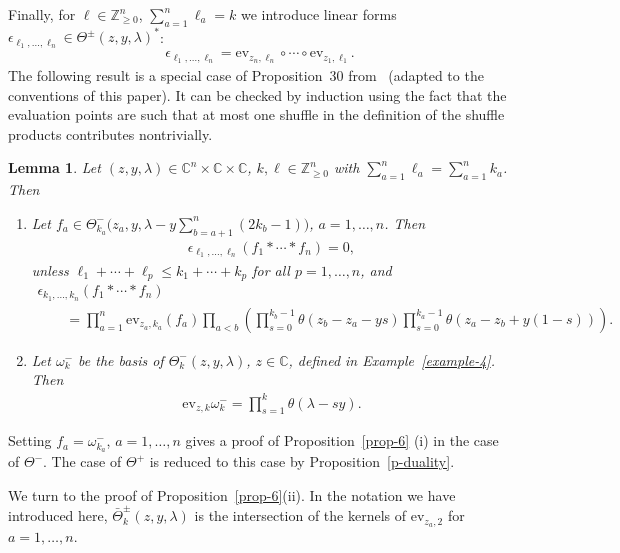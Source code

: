 \documentclass[pdftex]{sigma}
\numberwithin{equation}{section}
\newtheorem{Lemma}[Theorem]{Lemma}
\begin{document}
Finally, for $\ell\in\mathbb Z_{\geq0}^n$, $\sum\limits_{a=1}^n\ell_a=k$ we introduce linear forms $\epsilon_{\ell_1,\dots,\ell_n}\in\Theta^\pm(z,y,\lambda)^*$:
\begin{gather*}
 \epsilon_{\ell_1,\dots,\ell_n}= \mathrm{ev}_{z_n,\ell_n}\circ\cdots\circ\mathrm{ev}_{z_1,\ell_1}.
\end{gather*}
The following result is a special case of Proposition~30 from~\cite{FelderTarasovVarchenko1997} (adapted to the conventions of this paper). It can be checked by induction using the fact that the evaluation points are such that at most one shuffle in the definition of the shuffle products contributes nontrivially.
\begin{Lemma}\label{lemma-7} Let $(z,y,\lambda)\in\mathbb C^n\times \mathbb C\times\mathbb C$, $k,\ell\in\mathbb Z_{\geq0}^n$ with $\sum\limits_{a=1}^n\ell_a= \sum\limits_{a=1}^n k_a$. Then
 \begin{enumerate}\itemsep=0pt
 \item[$(i)$] Let $f_a\in\Theta^-_{k_a}\Big(z_a,y,\lambda-y\sum\limits_{b=a+1}^n(2k_b-1)\Big)$, $a=1,\dots,n$. Then
 \begin{gather*}
 \epsilon_{\ell_1,\dots,\ell_n}(f_1*\cdots*f_n)=0,
 \end{gather*}
 unless $\ell_1+\cdots+\ell_p\leq k_1+\cdots+k_p$ for all $p=1,\dots,n$, and
 \begin{gather*}
 \epsilon_{k_1,\dots,k_n} (f_1*\cdots*f_n) \\
\qquad {} =\prod_{a=1}^n\mathrm{ev}_{z_a,k_a}(f_a) \prod_{a<b}\left(\prod_{s=0}^{k_b-1}\theta(z_b-z_a-ys) \prod_{s=0}^{k_a-1}\theta(z_a-z_b+y(1-s))\right).
 \end{gather*}
 \item[$(ii)$] Let $\omega^-_k$ be the basis of $\Theta^-_k(z,y,\lambda)$, $z\in\mathbb C$, defined in Example~{\rm \ref{example-4}}. Then
 \begin{gather*}
 \mathrm{ev}_{z,k}\omega^-_k=\prod_{s=1}^k\theta(\lambda-sy).
 \end{gather*}
 \end{enumerate}
\end{Lemma}

Setting $f_a=\omega^-_{k_a}$, $a=1,\dots, n$ gives a proof of Proposition~\ref{prop-6} (i) in the case of $\Theta^-$. The case of $\Theta^+$ is reduced to this case by Proposition~\ref{p-duality}.

We turn to the proof of Proposition~\ref{prop-6}(ii). In the notation we have introduced here, $\bar\Theta^\pm_k(z,y,\lambda)$ is the intersection of the kernels of $\mathrm{ev}_{z_a,2}$ for $a=1,\dots,n$.
\end{document}
